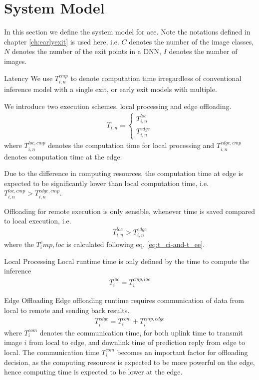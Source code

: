 \section{System Model} \label{sec:edge-system-model}

In this section we define the system model for \gls{aee}. Note the notations defined in chapter \ref{ch:earlyexit} is used here, i.e. $ C $ denotes the number of the image classes, $ N $ denotes the number of the exit points in a DNN, $ I $ denotes the number of images. 
		
	\begin{enumdescript}
		\item[Latency]  We use $ T_{i,n}^{cmp} $ to denote computation time irregardless of conventional inference model with a single exit, or early exit models with multiple. 
		
		We introduce two execution schemes, local processing and edge offloading.
		\begin{align}
		T_{i,n} = \begin{cases}
		T_{i,n}^{loc} \\
		T_{i,n}^{edge}
		\end{cases}
		\end{align}
		where $ T_{i,n}^{loc,cmp} $ denotes the computation time for local processing  and $ T_{i,n}^{edge,cmp} $ denotes computation time at the edge. 
		
		Due to the difference in computing resources, the computation time at edge is expected to be significantly lower than local computation time, i.e. $ T_{i,n}^{loc,cmp} > T_{i,n}^{edge,cmp} $. 
		
		Offloading for remote execution is only sensible, whenever time is saved compared to local execution, i.e.
		\begin{align*}
		T_{i,n}^{loc} > T_{i,n}^{edge}
		\end{align*}
		where the $ T_i^cmp,loc $ is calculated following eq. \ref{eq:t_ci-and-t_ee}.

		\begin{enumdescript}
			\item[Local Processing] Local runtime time is only defined by the time to compute the inference
			\begin{align}
			T_{i}^{loc}= T_{i}^{cmp,loc}
			\end{align}
			\item[Edge Offloading] Edge offloading runtime requires communication of data from local to remote and sending back results.
			\begin{align}
			T_{i}^{edge}=T_{i}^{com}+ T_{i}^{cmp,edge}
			\end{align}
			where $ T^{com}_i $ denotes the communication time, for both uplink time to transmit image $ i $ from local to edge, and downlink time of prediction reply from edge to local. The communication time $ T^{com}_i $ becomes an important factor for offloading decision, as the computing resources is expected to be more powerful on the edge, hence computing time is expected to be lower at the edge.
			


\end{enumdescript}
\end{enumdescript}
